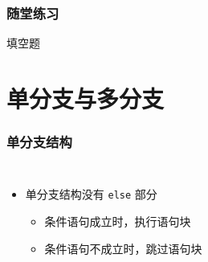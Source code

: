 \begin{frame}[fragile]
    \frametitle{随堂练习}

    \begin{exampleblock}{填空题}

        \begin{enumerate}


        \end{enumerate}

    \end{exampleblock}
\end{frame}


\section{单分支与多分支}

\begin{frame}[fragile]
    \frametitle{单分支结构}

    \begin{columns}
        \begin{itemize}[<+->]
            \item 单分支结构没有 \lstinline|else| 部分

                \begin{itemize}
                    \item 条件语句成立时，执行语句块
                    \item 条件语句不成立时，跳过语句块
                \end{itemize}

        \end{itemize}

        
    \end{columns}
\end{frame}

